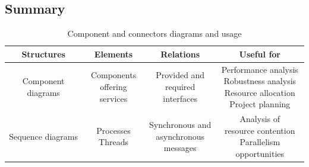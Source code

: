 \documentclass[12pt, a4paper]{report}
\begin{document}
        \subsection{Summary}
        \begin{table}[H]
            \centering
            \begin{tabular}{|c|ccc|}
            \hline
            \textbf{Structures}    & \textbf{Elements}                              & \textbf{Relations}                                                    & \textbf{Useful for}                                                                           \\ \hline
            Component diagrams     & \makecell{Components\\offering services}       & \makecell{Provided and\\required interfaces}                          & \makecell{Performance analysis\\Robustness analysis\\Resource allocation\\Project planning}   \\ \hline
            Sequence diagrams      & \makecell{Processes\\Threads}                  & \makecell{Synchronous and\\asynchronous\\messages}                     & \makecell{Analysis of\\resource contention\\Parallelism opportunities}                         \\ \hline
            \end{tabular}
            \caption{Component and connectors diagrams and usage}
        \end{table}
\end{document}
